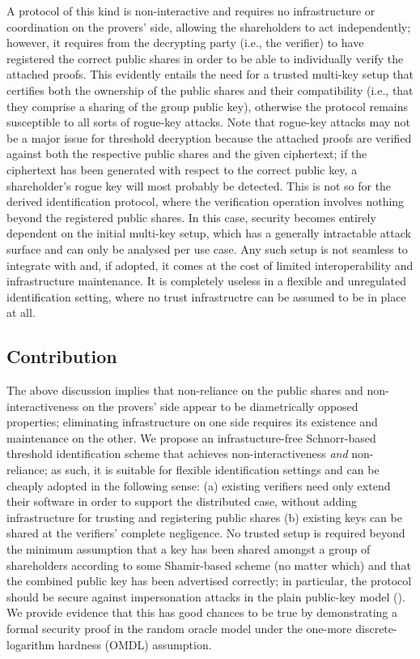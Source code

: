 \documentclass{iacrtrans}
\begin{document}
A protocol of this kind is non-interactive and requires
no infrastructure or coordination on the provers' side,
allowing the shareholders to act independently; however,
it requires from the decrypting party (i.e., the verifier)
to have registered the correct public shares
in order to be able to individually verify the attached proofs.
This evidently entails the need for a trusted multi-key setup
that certifies both the ownership of the public shares
and their compatibility (i.e., that they
comprise a sharing of the group public key),
otherwise the protocol remains susceptible
to all sorts of rogue-key attacks.
Note that rogue-key attacks may not be a major issue
for threshold decryption because the attached
proofs are verified against both the respective public shares
and the given ciphertext; if the ciphertext has been generated
with respect to the correct public key,
a shareholder's rogue key will
most probably be detected. This is not so for the derived
identification protocol,
where the verification operation involves nothing
beyond the registered public shares.
In this case, security becomes
entirely dependent on the initial multi-key setup,
which has a generally intractable attack surface
and can only be analysed per use case.
Any such setup is not seamless to integrate with and,
if adopted, it comes at the cost of limited interoperability
and infrastructure maintenance.
It is completely useless
in a flexible and unregulated identification setting,
where no trust infrastructre can be assumed to be
in place at all.

\subsection{Contribution}\label{section_contribution}
The above discussion implies
that non-reliance on the public shares
and non-interactiveness on the provers' side appear to be
diametrically opposed properties;
eliminating infrastructure on one side
requires its existence and maintenance on the other.
We propose an infrastucture-free
Schnorr-based threshold identification scheme
that achieves non-interactiveness \textit{and} non-reliance;
as such, it is suitable for flexible identification
settings and can be cheaply adopted
in the following sense: (a) existing verifiers
need only extend their software
in order to support the distributed case,
without adding infrastructure
for trusting and registering
public shares (b) existing keys
can be shared at the verifiers' complete negligence.
No trusted setup is required beyond
the minimum assumption that a key has been
shared amongst a group of shareholders according to some
Shamir-based scheme (no matter which)
and that the combined public key has been advertised
correctly; in particular,
the protocol should be secure against
impersonation attacks in the plain public-key model
(\cite{paper_bellare_musig}).
We provide evidence that this has good chances to be true
by demonstrating a formal security proof in the random oracle model
under the one-more discrete-logarithm hardness (OMDL) assumption.
\end{document}
